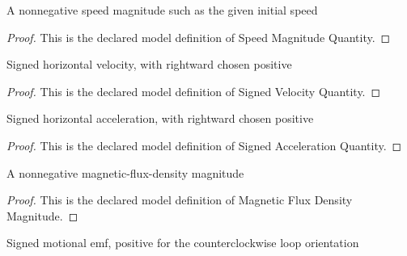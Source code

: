 \begin{definition}
  \label{def:physics:phyx-mini-0977:phyxminiproblems-problemphyxmini0977-speedmagnitudequantity}
  A nonnegative speed magnitude such as the given initial speed
\end{definition}
\begin{proof}
  This is the declared model definition of Speed Magnitude Quantity.
\end{proof}
\begin{definition}
  \label{def:physics:phyx-mini-0977:phyxminiproblems-problemphyxmini0977-signedvelocityquantity}
  Signed horizontal velocity, with rightward chosen positive
\end{definition}
\begin{proof}
  This is the declared model definition of Signed Velocity Quantity.
\end{proof}
\begin{definition}
  \label{def:physics:phyx-mini-0977:phyxminiproblems-problemphyxmini0977-signedaccelerationquantity}
  Signed horizontal acceleration, with rightward chosen positive
\end{definition}
\begin{proof}
  This is the declared model definition of Signed Acceleration Quantity.
\end{proof}
\begin{definition}
  \label{def:physics:phyx-mini-0977:phyxminiproblems-problemphyxmini0977-magneticfluxdensitymagnitude}
  A nonnegative magnetic-flux-density magnitude
\end{definition}
\begin{proof}
  This is the declared model definition of Magnetic Flux Density Magnitude.
\end{proof}
\begin{definition}
  \label{def:physics:phyx-mini-0977:phyxminiproblems-problemphyxmini0977-signedemfquantity}
  Signed motional emf, positive for the counterclockwise loop orientation
\end{definition}
